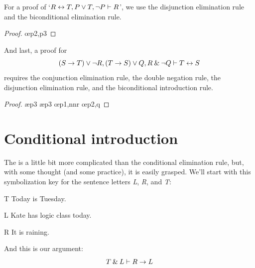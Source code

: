 \begin{earg}
\item[\ex{14.6.4}] For a proof of `$R \leftrightarrow T, P \vee T, {\neg} P \vdash R$', we use the disjunction elimination rule and the biconditional elimination rule.
\begin{proof}
	 \pr{}
	 \pr{}
	 \pr{}
	 \oe{p2,p3}
	 
\end{proof}\medskip

\item[\ex{14.6.5}] And last, a proof for $$(S \rightarrow T) \vee {\neg} R, (T \rightarrow S) \vee Q, R \mathbin{\&} {\neg} Q \vdash T \leftrightarrow S$$ requires the conjunction elimination rule, the double negation rule, the disjunction elimination rule, and the biconditional introduction rule.
\begin{proof}
	 \pr{}
	 \pr{}
	 \pr{}
	 \ae{p3}
	 \ae{p3}
	 
	 \oe{p1,nnr}
	 \oe{p2,q}
	 
\end{proof}\medskip
\end{earg}


\section{Conditional introduction}
\label{s:CI-rule}

The  is a little bit more complicated than the conditional elimination rule, but, with some thought (and some practice), it is easily grasped. We'll start with this symbolization key for the sentence letters \textit{L}, \textit{R}, and \textit{T}:
	\begin{ekey}
		\item[T] Today is Tuesday.
		\item[L] Kate has logic class today.
		\item[R] It is raining.
	\end{ekey}
And this is our argument: 
$$T \mathbin{\&} L \vdash R \rightarrow L$$
 
